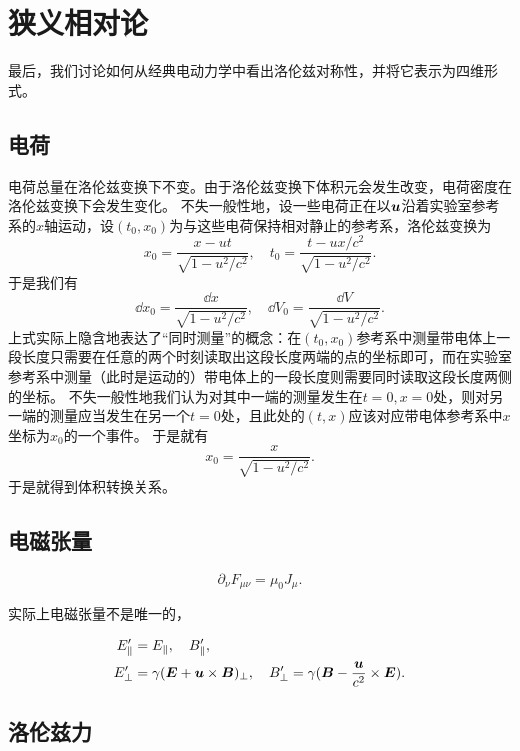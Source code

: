\documentclass[UTF8, a4paper]{ctexart}
\begin{document}
\section{狭义相对论}

最后，我们讨论如何从经典电动力学中看出洛伦兹对称性，并将它表示为四维形式。

\subsection{电荷}

电荷总量在洛伦兹变换下不变。由于洛伦兹变换下体积元会发生改变，电荷密度在洛伦兹变换下会发生变化。
不失一般性地，设一些电荷正在以$\vb*{u}$沿着实验室参考系的$x$轴运动，设$(t_0, x_0)$为与这些电荷保持相对静止的参考系，洛伦兹变换为
\[
    x_0 = \frac{x - ut}{\sqrt{1 - u^2/c^2}}, \quad t_0 = \frac{t - ux / c^2}{\sqrt{1 - u^2 / c^2}}.
\]
于是我们有
\[
    \dd{x_0} = \frac{\dd{x}}{\sqrt{1 - u^2/c^2}}, \quad \dd{V_0} = \frac{\dd{V}}{\sqrt{1 - u^2/c^2}}.
\]
上式实际上隐含地表达了“同时测量”的概念：在$(t_0, x_0)$参考系中测量带电体上一段长度只需要在任意的两个时刻读取出这段长度两端的点的坐标即可，而在实验室参考系中测量（此时是运动的）带电体上的一段长度则需要同时读取这段长度两侧的坐标。
不失一般性地我们认为对其中一端的测量发生在$t=0, x=0$处，则对另一端的测量应当发生在另一个$t=0$处，且此处的$(t, x)$应该对应带电体参考系中$x$坐标为$x_0$的一个事件。
于是就有
\[
    x_0 = \frac{x}{\sqrt{1 - u^2/c^2}}.
\]
于是就得到体积转换关系。

\subsection{电磁张量}

\begin{equation}
    \partial_\nu F_{\mu \nu} = \mu_0 J_\mu.
\end{equation}

实际上电磁张量不是唯一的，

\begin{equation}
    \begin{aligned}
        E_\parallel' &= E_\parallel, \quad B_\parallel' , \\
        E_\bot' &= \gamma (\vb*{E} + \vb*{u} \times \vb*{B})_\bot, \quad B_\bot' = \gamma (\vb*{B} - \frac{\vb*{u}}{c^2} \times \vb*{E}).
    \end{aligned}
\end{equation}

\subsection{洛伦兹力}
\end{document}
